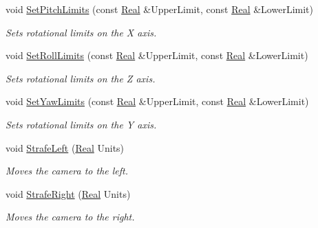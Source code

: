 \begin{DoxyCompactItemize}
void \hyperlink{classMezzanine_1_1CameraController_afbf7f8b9b27f565e4002ea2944724b2f}{SetPitchLimits} (const \hyperlink{namespaceMezzanine_a726731b1a7df72bf3583e4a97282c6f6}{Real} \&UpperLimit, const \hyperlink{namespaceMezzanine_a726731b1a7df72bf3583e4a97282c6f6}{Real} \&LowerLimit)
\begin{DoxyCompactList}\small\item\em Sets rotational limits on the X axis. \item\end{DoxyCompactList}\item 
void \hyperlink{classMezzanine_1_1CameraController_aeda898e8a4e244eec905478b7f033c41}{SetRollLimits} (const \hyperlink{namespaceMezzanine_a726731b1a7df72bf3583e4a97282c6f6}{Real} \&UpperLimit, const \hyperlink{namespaceMezzanine_a726731b1a7df72bf3583e4a97282c6f6}{Real} \&LowerLimit)
\begin{DoxyCompactList}\small\item\em Sets rotational limits on the Z axis. \item\end{DoxyCompactList}\item 
void \hyperlink{classMezzanine_1_1CameraController_a99491e652e97e725ec058834c2d17b70}{SetYawLimits} (const \hyperlink{namespaceMezzanine_a726731b1a7df72bf3583e4a97282c6f6}{Real} \&UpperLimit, const \hyperlink{namespaceMezzanine_a726731b1a7df72bf3583e4a97282c6f6}{Real} \&LowerLimit)
\begin{DoxyCompactList}\small\item\em Sets rotational limits on the Y axis. \item\end{DoxyCompactList}\item 
void \hyperlink{classMezzanine_1_1CameraController_a6297e8a56f401bd2967032a6370c07b8}{StrafeLeft} (\hyperlink{namespaceMezzanine_a726731b1a7df72bf3583e4a97282c6f6}{Real} Units)
\begin{DoxyCompactList}\small\item\em Moves the camera to the left. \item\end{DoxyCompactList}\item 
void \hyperlink{classMezzanine_1_1CameraController_a37e9081283df3f3f7129879e01ee62ae}{StrafeRight} (\hyperlink{namespaceMezzanine_a726731b1a7df72bf3583e4a97282c6f6}{Real} Units)
\begin{DoxyCompactList}\small\item\em Moves the camera to the right. \item\end{DoxyCompactList}\end{DoxyCompactItemize}
